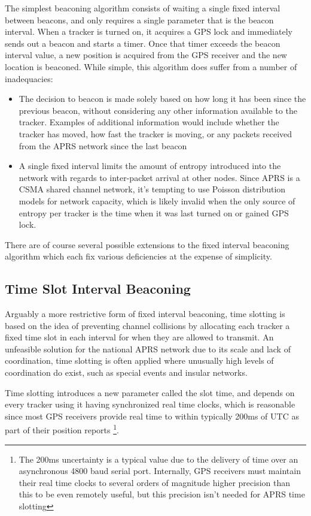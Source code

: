 The simplest beaconing algorithm consists of waiting a single fixed interval
between beacons, and only requires a single parameter that is the beacon interval.
When a tracker is turned on, it acquires a GPS lock and immediately sends out a 
beacon and starts a timer. Once that timer exceeds the beacon interval value, a 
new position is acquired from the GPS receiver and the new location is beaconed.
While simple, this algorithm does suffer from a number of inadequacies:
\begin{itemize}
\item The decision to beacon is made solely based on how long it has been
since the previous beacon, without considering any other information available
to the tracker. Examples of additional information would include whether the 
tracker has moved, how fast the tracker is moving, or any packets received from
the APRS network since the last beacon
\item A single fixed interval limits the amount of entropy introduced into the
network with regards to inter-packet arrival at other nodes. Since APRS is a 
CSMA shared channel network, it's tempting to use Poisson distribution models
for network capacity, which is likely invalid when the only source of entropy 
per tracker is the time when it was last turned on or gained GPS lock.
\end{itemize}

There are of course several possible extensions to the fixed interval beaconing
algorithm which each fix various deficiencies at the expense of simplicity.

\subsection{Time Slot Interval Beaconing}
\label{subsec:timeslot}

Arguably a more restrictive form of fixed interval beaconing, time slotting is 
based on the idea of preventing channel collisions by allocating each tracker
a fixed time slot in each interval for when they are allowed to transmit.
An unfeasible solution for the national APRS network due to its scale and lack
of coordination, time slotting is often applied where unusually high levels of
coordination do exist, such as special events and insular networks.

Time slotting introduces a new parameter called the slot time, and depends on every
tracker using it having synchronized real time clocks, which is reasonable since most
GPS receivers provide real time to within typically 200ms of UTC 
as part of their position reports
\footnote{The 200ms uncertainty is a typical value due to the delivery of time over
an asynchronous 4800 baud serial port. Internally, GPS receivers must maintain 
their real time clocks to several orders of magnitude higher precision than this
to be even remotely useful, but this precision isn't needed for APRS time slotting}.

